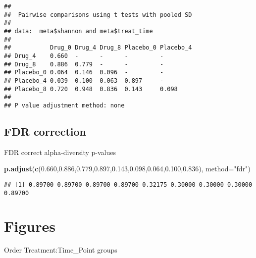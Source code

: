 \documentclass[]{article}
\newenvironment{Shaded}{\begin{snugshade}}{\end{snugshade}}
\newcommand{\KeywordTok}[1]{\textcolor[rgb]{0.13,0.29,0.53}{\textbf{#1}}}
\newcommand{\DataTypeTok}[1]{\textcolor[rgb]{0.13,0.29,0.53}{#1}}
\newcommand{\FloatTok}[1]{\textcolor[rgb]{0.00,0.00,0.81}{#1}}
\newcommand{\StringTok}[1]{\textcolor[rgb]{0.31,0.60,0.02}{#1}}
\newcommand{\OperatorTok}[1]{\textcolor[rgb]{0.81,0.36,0.00}{\textbf{#1}}}
\newcommand{\NormalTok}[1]{#1}
\begin{document}
\begin{verbatim}
## 
##  Pairwise comparisons using t tests with pooled SD 
## 
## data:  meta$shannon and meta$treat_time 
## 
##           Drug_0 Drug_4 Drug_8 Placebo_0 Placebo_4
## Drug_4    0.660  -      -      -         -        
## Drug_8    0.886  0.779  -      -         -        
## Placebo_0 0.064  0.146  0.096  -         -        
## Placebo_4 0.039  0.100  0.063  0.897     -        
## Placebo_8 0.720  0.948  0.836  0.143     0.098    
## 
## P value adjustment method: none
\end{verbatim}

\subsection{FDR correction}\label{fdr-correction-1}

FDR correct alpha-diversity p-values

\begin{Shaded}
\begin{Highlighting}[]
\KeywordTok{p.adjust}\NormalTok{(}\KeywordTok{c}\NormalTok{(}\FloatTok{0.660}\NormalTok{,}\FloatTok{0.886}\NormalTok{,}\FloatTok{0.779}\NormalTok{,}\FloatTok{0.897}\NormalTok{,}\FloatTok{0.143}\NormalTok{,}\FloatTok{0.098}\NormalTok{,}\FloatTok{0.064}\NormalTok{,}\FloatTok{0.100}\NormalTok{,}\FloatTok{0.836}\NormalTok{), }\DataTypeTok{method=}\StringTok{"fdr"}\NormalTok{)}
\end{Highlighting}
\end{Shaded}

\begin{verbatim}
## [1] 0.89700 0.89700 0.89700 0.89700 0.32175 0.30000 0.30000 0.30000 0.89700
\end{verbatim}

\section{Figures}\label{figures}

Order Treatment:Time\_Point groups

\begin{Shaded}
\end{Shaded}
\end{document}
